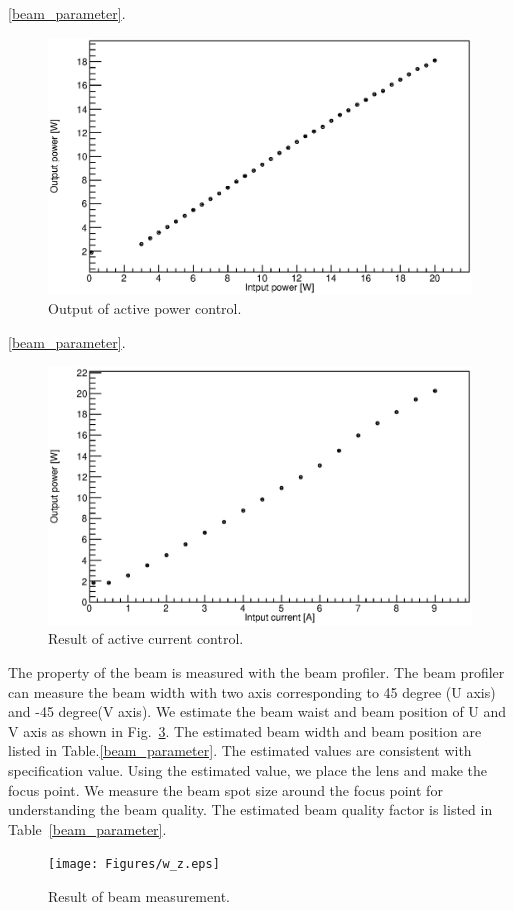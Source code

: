\ref{beam_parameter}.
\begin{figure}
\begin{center}
\includegraphics[width=12cm]{Figures/APC_Power.eps}
\caption{Output of active power control.} 
\label{fig:APC} 
\end{center}
\end{figure}
\ref{beam_parameter}.
\begin{figure}
\begin{center}
\includegraphics[width=12cm]{Figures/ACC_Power.eps}
\caption{Result of active current control.} 
\label{fig:ACC} 
\end{center}
\end{figure}

The property of the beam is measured with the beam profiler. The beam profiler can measure the beam width with two axis corresponding to 45 degree (U axis) and -45 degree(V axis). We estimate the beam waist and beam position of U and V axis as shown in Fig.~\ref{fig:w_z}. The estimated beam width and beam position are listed in Table.\ref{beam_parameter}. The estimated values are consistent with specification value. Using the estimated value, we place the lens and make the focus point. We measure the beam spot size around the focus point for understanding the beam quality. The estimated beam quality factor is listed in Table~\ref{beam_parameter}.
\begin{figure}
\begin{center}
\texttt{[image: Figures/w\_z.eps]}
\caption{Result of beam measurement.} 
\label{fig:w_z} 
\end{center}
\end{figure}

